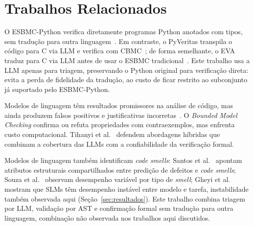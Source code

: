 \documentclass[sigconf]{acmart}
\begin{document}
\section{Trabalhos Relacionados}
O ESBMC-Python verifica diretamente programas Python anotados com tipos, sem tradução para outra linguagem~\cite{farias2024esbmcpython}. Em contraste, o PyVeritas transpila o código para C via LLM e verifica com CBMC~\cite{orvalho2025pyveritas}; de forma semelhante, o EVA traduz para C via LLM antes de usar o ESBMC tradicional~\cite{shivaji2026eva}. Este trabalho usa a LLM apenas para triagem, preservando o Python original para verificação direta: evita a perda de fidelidade da tradução, ao custo de ficar restrito ao subconjunto já suportado pelo ESBMC-Python.


Modelos de linguagem têm resultados promissores na análise de código, mas ainda produzem falsos positivos e justificativas incorretas~\cite{ding2025primevul}. O \textit{Bounded Model Checking} confirma ou refuta propriedades com contraexemplos, mas enfrenta custo computacional. Tihanyi et al.~\cite{tihanyi2025vulnerability} defendem abordagens híbridas que combinam a cobertura das LLMs com a confiabilidade da verificação formal.


Modelos de linguagem também identificam \textit{code smells}: Santos et al.~\cite{santos2023yetanothermodel} apontam atributos estruturais compartilhados entre predição de defeitos e \textit{code smells}; Souza et al.~\cite{souza2026beyondstrictrules} observam desempenho variável por tipo de \textit{smell}; Gheyi et al.~\cite{gheyi2025slms} mostram que SLMs têm desempenho instável entre modelo e tarefa, instabilidade também observada aqui (Seção~\ref{sec:resultados}). Este trabalho combina triagem por LLM, validação por AST e confirmação formal sem tradução para outra linguagem, combinação não observada nos trabalhos aqui discutidos.

\end{document}
